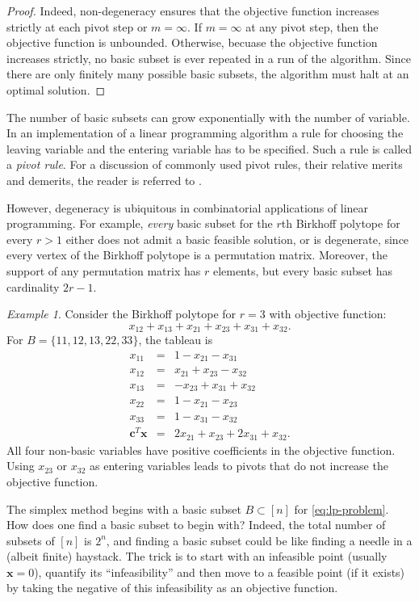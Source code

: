 \documentclass{amsbook}
\newcommand{\xx}{\mathbf x}
\newcommand{\cc}{\mathbf c}
\theoremstyle{definition}
\theoremstyle{remark}
\newtheorem{example}[theorem]{Example}
\begin{document}
\begin{proof}
  Indeed, non-degeneracy ensures that the objective function increases strictly at each pivot step or $m=\infty$.
  If $m=\infty$ at any pivot step, then the objective function is unbounded.
  Otherwise, becuase the objective function increases strictly, no basic subset is ever repeated in a run of the algorithm.
  Since there are only finitely many possible basic subsets, the algorithm must halt at an optimal solution.
\end{proof}
The number of basic subsets can grow exponentially with the number of variable.
In an implementation of a linear programming algorithm a rule for choosing the leaving variable and the entering variable has to be specified.
Such a rule is called a \emph{pivot rule}.
For a discussion of commonly used pivot rules, their relative merits and demerits, the reader is referred to \cite[Section~5.7]{GM}.

However, degeneracy is ubiquitous in combinatorial applications of linear programming.
For example, \emph{every} basic subset for the $r$th Birkhoff polytope for every $r>1$ either does not admit a basic feasible solution, or is degenerate, since every vertex of the Birkhoff polytope is a permutation matrix.
Moreover, the support of any permutation matrix has $r$ elements, but every basic subset has cardinality $2r-1$.
\begin{example}
  Consider the Birkhoff polytope for $r=3$ with objective function:
  \begin{displaymath}
    x_{12}+x_{13}+x_{21}+x_{23}+x_{31}+x_{32}.
  \end{displaymath}
  For $B=\{11,12,13,22,33\}$, the tableau is
  \begin{displaymath}
    \begin{matrix}
      x_{11}&=&1-x_{21}-x_{31}\\
      x_{12}&=&x_{21}+x_{23}-x_{32}\\
      x_{13}&=&-x_{23}+x_{31}+x_{32}\\
      x_{22}&=&1-x_{21}-x_{23}\\
      x_{33}&=&1-x_{31}-x_{32}\\
      \hline
      \cc^T\xx&=&2x_{21}+x_{23}+2x_{31}+x_{32}.
    \end{matrix}
  \end{displaymath}
  All four non-basic variables have positive coefficients in the objective function.
  Using $x_{23}$ or $x_{32}$ as entering variables leads to pivots that do not increase the objective function.
\end{example}
The simplex method begins with a basic subset $B\subset [n]$ for \eqref{eq:lp-problem}.
How does one find a basic subset to begin with?
Indeed, the total number of subsets of $[n]$ is $2^n$, and finding a basic subset could be like finding a needle in a (albeit finite) haystack.
The trick is to start with an infeasible point (usually $\xx=0$), quantify its ``infeasibility'' and then move to a feasible point (if it exists) by taking the negative of this infeasibility as an objective function.
\end{document}
